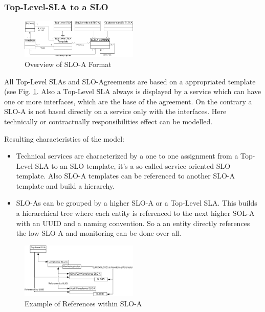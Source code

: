 \subsubsection{Top-Level-SLA to a SLO}
\begin{figure}[ht]
\includegraphics[width=0.5\textwidth]{fig/sloa_arch_allg.png}
\caption{Overview of SLO-A Format}
\label{fig:overview_sloa}
\end{figure}
All Top-Level SLAs and SLO-Agreements are based on a appropriated template (see Fig. \ref{fig:overview_sloa}. Also a Top-Level SLA always is displayed by a service which can have one or more interfaces, which are the base of the agreement. On the contrary a SLO-A is not based directly on a service only with the interfaces. Here technically or contractually responsibilities effect can be modelled.

Resulting characteristics of the model:
\begin{itemize}
\item Technical services are characterized by a one to one assignment from a Top-Level-SLA to an SLO template, it's a so called service oriented SLO template. Also SLO-A templates can be referenced to another SLO-A template and build a hierarchy.
\item SLO-As can be grouped by a higher SLO-A or a Top-Level SLA. This builds a hierarchical tree where each entity is referenced to the next higher SOL-A with an UUID and a naming convention. So a an entity directly references the low SLO-A and monitoring can be done over all. 
\end{itemize}
\begin{figure}[ht]
\includegraphics[width=0.5\textwidth]{fig/sloa_arch_refs.png}
\caption{Example of References within SLO-A}
\label{fig:example_sloa}
\end{figure}

